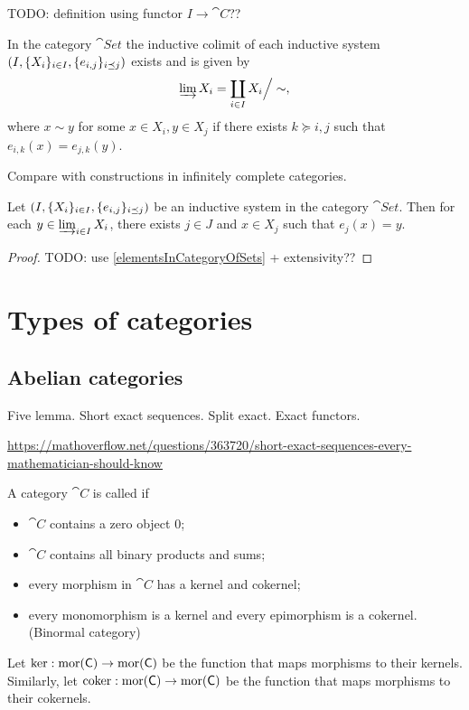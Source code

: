 TODO: definition using functor $I\to \cat{C}$??

\begin{proposition} \label{inductiveLimitSet}
In the category $\cat{Set}$ the inductive colimit of each inductive system $\left( I, \{X_i\}_{i\in I}, \{e_{i,j}\}_{i\preceq j} \right)$ exists and is given by
\[ \varinjlim X_{i}=\coprod_{i\in I}X_{i}{\Big /}\sim, \]
where $x\sim y$ for some $x\in X_i, y\in X_j$ if there exists $k \succeq i,j$ such that $e_{i,k}(x) = e_{j,k}(y)$.
\end{proposition}
Compare with constructions in infinitely complete categories.

\begin{lemma} \label{elementsOfInductiveLimitImages}
Let $\left( I, \{X_i\}_{i\in I}, \{e_{i,j}\}_{i\preceq j} \right)$ be an inductive system in the category $\cat{Set}$. Then for each $y\in \varinjlim_{i\in I} X_{i}$, there exists $j\in J$ and $x\in X_j$ such that $e_j(x) = y$.
\end{lemma}
\begin{proof}
TODO: use \ref{elementsInCategoryOfSets} + extensivity??
\end{proof}

\chapter{Types of categories}
\section{Abelian categories}
Five lemma. Short exact sequences. Split exact. Exact functors.


\url{https://mathoverflow.net/questions/363720/short-exact-sequences-every-mathematician-should-know}

\begin{definition}
A category $\cat{C}$ is called  if
\begin{itemize}
\item $\cat{C}$ contains a zero object $0$;
\item $\cat{C}$ contains all binary products and sums;
\item every morphism in $\cat{C}$ has a kernel and cokernel;
\item every monomorphism is a kernel and every epimorphism is a cokernel. (Binormal category)
\end{itemize}
Let $\ker: \operatorname{mor}(\mathsf{C}) \to \operatorname{mor}(\mathsf{C})$ be the function that maps morphisms to their kernels. Similarly, let $\operatorname{coker}: \operatorname{mor}(\mathsf{C}) \to \operatorname{mor}(\mathsf{C})$ be the function that maps morphisms to their cokernels.
\end{definition}



